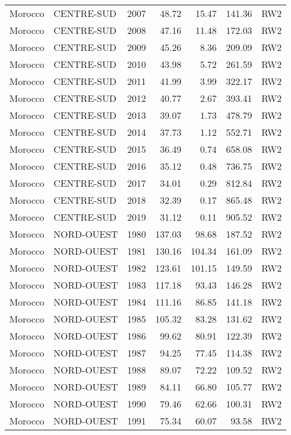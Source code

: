 \begin{longtable}{lllrrrl}
  Morocco & CENTRE-SUD & 2007 & 48.72 & 15.47 & 141.36 & RW2 \\ 
  Morocco & CENTRE-SUD & 2008 & 47.16 & 11.48 & 172.03 & RW2 \\ 
  Morocco & CENTRE-SUD & 2009 & 45.26 & 8.36 & 209.09 & RW2 \\ 
  Morocco & CENTRE-SUD & 2010 & 43.98 & 5.72 & 261.59 & RW2 \\ 
  Morocco & CENTRE-SUD & 2011 & 41.99 & 3.99 & 322.17 & RW2 \\ 
  Morocco & CENTRE-SUD & 2012 & 40.77 & 2.67 & 393.41 & RW2 \\ 
  Morocco & CENTRE-SUD & 2013 & 39.07 & 1.73 & 478.79 & RW2 \\ 
  Morocco & CENTRE-SUD & 2014 & 37.73 & 1.12 & 552.71 & RW2 \\ 
  Morocco & CENTRE-SUD & 2015 & 36.49 & 0.74 & 658.08 & RW2 \\ 
  Morocco & CENTRE-SUD & 2016 & 35.12 & 0.48 & 736.75 & RW2 \\ 
  Morocco & CENTRE-SUD & 2017 & 34.01 & 0.29 & 812.84 & RW2 \\ 
  Morocco & CENTRE-SUD & 2018 & 32.39 & 0.17 & 865.48 & RW2 \\ 
  Morocco & CENTRE-SUD & 2019 & 31.12 & 0.11 & 905.52 & RW2 \\ 
  Morocco & NORD-OUEST & 1980 & 137.03 & 98.68 & 187.52 & RW2 \\ 
  Morocco & NORD-OUEST & 1981 & 130.16 & 104.34 & 161.09 & RW2 \\ 
  Morocco & NORD-OUEST & 1982 & 123.61 & 101.15 & 149.59 & RW2 \\ 
  Morocco & NORD-OUEST & 1983 & 117.18 & 93.43 & 146.28 & RW2 \\ 
  Morocco & NORD-OUEST & 1984 & 111.16 & 86.85 & 141.18 & RW2 \\ 
  Morocco & NORD-OUEST & 1985 & 105.32 & 83.28 & 131.62 & RW2 \\ 
  Morocco & NORD-OUEST & 1986 & 99.62 & 80.91 & 122.39 & RW2 \\ 
  Morocco & NORD-OUEST & 1987 & 94.25 & 77.45 & 114.38 & RW2 \\ 
  Morocco & NORD-OUEST & 1988 & 89.07 & 72.22 & 109.52 & RW2 \\ 
  Morocco & NORD-OUEST & 1989 & 84.11 & 66.80 & 105.77 & RW2 \\ 
  Morocco & NORD-OUEST & 1990 & 79.46 & 62.66 & 100.31 & RW2 \\ 
  Morocco & NORD-OUEST & 1991 & 75.34 & 60.07 & 93.58 & RW2 \\ 

\end{longtable}

